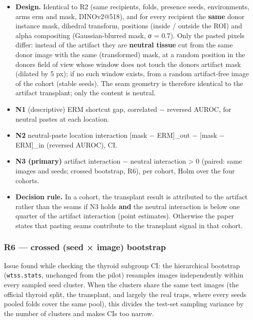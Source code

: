 {\begin{itemize}
\item
  \textbf{Design.} Identical to R2 (same recipients, folds, presence seeds, environments, arms erm and mask, DINOv2@518),
  and for every recipient the \textbf{same} donor instance mask, dihedral transform, positions (inside / outside the ROI)
  and alpha compositing (Gaussian-blurred mask, σ = 0.7). Only the pasted pixels differ: instead of the artifact they
  are \textbf{neutral tissue} cut from the same donor image with the same (transformed) mask, at a random position in the
  donor\textquotesingle s field of view whose window does not touch the donor\textquotesingle s artifact mask (dilated by 5 px); if no such window
  exists, from a random artifact-free image of the cohort (stable seeds). The seam geometry is therefore identical to
  the artifact transplant; only the content is neutral.
\item
  \textbf{N1} (descriptive) ERM shortcut gap, correlated − reversed AUROC, for neutral pastes at each location.
\item
  \textbf{N2} neutral-paste location interaction {[}mask − ERM{]}\_out − {[}mask − ERM{]}\_in (reversed AUROC), CI.
\item
  \textbf{N3 (primary)} artifact interaction − neutral interaction \textgreater{} 0 (paired: same images and seeds; crossed bootstrap,
  R6), per cohort, Holm over the four cohorts.
\item
  \textbf{Decision rule.} In a cohort, the transplant result is attributed to the artifact rather than the seams if N3
  holds \textbf{and} the neutral interaction is below one quarter of the artifact interaction (point estimates). Otherwise
  the paper states that pasting seams contribute to the transplant signal in that cohort.
\end{itemize}

\subsubsection{R6 --- crossed (seed × image) bootstrap}\label{r6--crossed-seed--image-bootstrap}

Issue found while checking the thyroid subgroup CI: the hierarchical bootstrap (\texttt{wtss.stats}, unchanged from the
pilot) resamples images independently within every sampled seed cluster. When the clusters share the same test images
(the official thyroid split, the transplant, and largely the real traps, where every seed\textquotesingle s pooled folds cover the
same pool), this divides the test-set sampling variance by the number of clusters and makes CIs too narrow.

}
